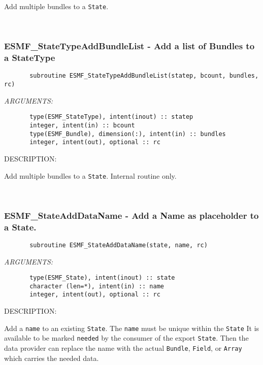         Add multiple bundles to a {\tt State}.
   
 
\mbox{}\hrulefill\ 
 
\subsubsection{ESMF\_StateTypeAddBundleList - Add a list of Bundles to a StateType}


  
\begin{verbatim}       subroutine ESMF_StateTypeAddBundleList(statep, bcount, bundles, rc)\end{verbatim}{\em ARGUMENTS:}
\begin{verbatim}       type(ESMF_StateType), intent(inout) :: statep
       integer, intent(in) :: bcount
       type(ESMF_Bundle), dimension(:), intent(in) :: bundles
       integer, intent(out), optional :: rc     \end{verbatim}
{\sf DESCRIPTION:\\ }


        Add multiple bundles to a {\tt State}.  Internal routine only.
   
 
\mbox{}\hrulefill\ 
 
\subsubsection{ESMF\_StateAddDataName - Add a Name as placeholder to a State.}


  
\begin{verbatim}       subroutine ESMF_StateAddDataName(state, name, rc)\end{verbatim}{\em ARGUMENTS:}
\begin{verbatim}       type(ESMF_State), intent(inout) :: state
       character (len=*), intent(in) :: name
       integer, intent(out), optional :: rc
       \end{verbatim}
{\sf DESCRIPTION:\\ }


        Add a {\tt name} to an existing {\tt State}.
        The {\tt name} must be unique within the {\tt State}
        It is available to be marked {\tt needed} by the
        consumer of the export {\tt State}. Then the data 
        provider can replace the name with the actual {\tt Bundle},
        {\tt Field}, or {\tt Array} which carries the needed data.
  
